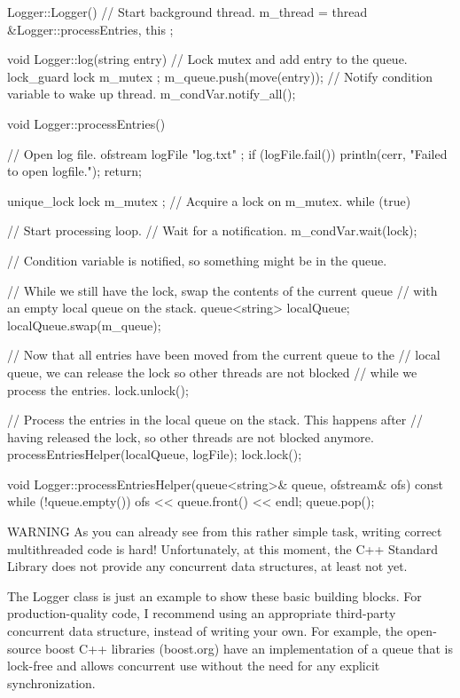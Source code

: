 \begin{cpp}
Logger::Logger()
{
    // Start background thread.
    m_thread = thread { &Logger::processEntries, this };
}

void Logger::log(string entry)
{
    // Lock mutex and add entry to the queue.
    lock_guard lock { m_mutex };
    m_queue.push(move(entry));
    // Notify condition variable to wake up thread.
    m_condVar.notify_all();
}

void Logger::processEntries()
{
    // Open log file.
    ofstream logFile { "log.txt" };
    if (logFile.fail()) {
        println(cerr, "Failed to open logfile.");
        return;
    }

    unique_lock lock { m_mutex }; // Acquire a lock on m_mutex.
    while (true) { // Start processing loop.
        // Wait for a notification.
        m_condVar.wait(lock);

        // Condition variable is notified, so something might be in the queue.

        // While we still have the lock, swap the contents of the current queue
        // with an empty local queue on the stack.
        queue<string> localQueue;
        localQueue.swap(m_queue);

        // Now that all entries have been moved from the current queue to the
        // local queue, we can release the lock so other threads are not blocked
        // while we process the entries.
        lock.unlock();

        // Process the entries in the local queue on the stack. This happens after
        // having released the lock, so other threads are not blocked anymore.
        processEntriesHelper(localQueue, logFile);
        lock.lock();
    }
}

void Logger::processEntriesHelper(queue<string>& queue, ofstream& ofs) const
{
    while (!queue.empty()) {
        ofs << queue.front() << endl;
        queue.pop();
    }
}
\end{cpp}

\begin{myWarning}{WARNING}
As you can already see from this rather simple task, writing correct multithreaded code is hard! Unfortunately, at this moment, the C++ Standard Library does not provide any concurrent data structures, at least not yet.

The Logger class is just an example to show these basic building blocks. For production-quality code, I recommend using an appropriate third-party concurrent data structure, instead of writing your own. For example, the open-source boost C++ libraries (boost.org) have an implementation of a queue that is lock-free and allows concurrent use without the need for any explicit synchronization.
\end{myWarning}

